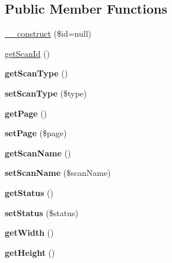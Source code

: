 \subsection*{Public Member Functions}
\begin{DoxyCompactItemize}
\item 
\hyperlink{classScan_ab363efba88dd615f165bc1466558b5ed}{\_\-\_\-construct} (\$id=null)
\item 
\hyperlink{classScan_a30ad0e456f9d0f3b3b0ef028e7e36d37}{getScanId} ()
\item 
\hypertarget{classScan_a42dd7daac88813b9d6f56fe25200b091}{
{\bfseries getScanType} ()}
\label{classScan_a42dd7daac88813b9d6f56fe25200b091}

\item 
\hypertarget{classScan_ad48c38cfecac0d7cc68987eaa94a4fd4}{
{\bfseries setScanType} (\$type)}
\label{classScan_ad48c38cfecac0d7cc68987eaa94a4fd4}

\item 
\hypertarget{classScan_a87a54b3f76ea8d9ebd38fca9e1cb872a}{
{\bfseries getPage} ()}
\label{classScan_a87a54b3f76ea8d9ebd38fca9e1cb872a}

\item 
\hypertarget{classScan_a478d366c5f8260ff0137d6800f548174}{
{\bfseries setPage} (\$page)}
\label{classScan_a478d366c5f8260ff0137d6800f548174}

\item 
\hypertarget{classScan_a741711f2da30f700b912d332dd877805}{
{\bfseries getScanName} ()}
\label{classScan_a741711f2da30f700b912d332dd877805}

\item 
\hypertarget{classScan_a0851d58f59a4eb565e79433fa2bffbc5}{
{\bfseries setScanName} (\$scanName)}
\label{classScan_a0851d58f59a4eb565e79433fa2bffbc5}

\item 
\hypertarget{classScan_a8e73646b63b62868d2fdb5d7a786b37e}{
{\bfseries getStatus} ()}
\label{classScan_a8e73646b63b62868d2fdb5d7a786b37e}

\item 
\hypertarget{classScan_a3464fedd4ccf9fb835675d7f2728ca11}{
{\bfseries setStatus} (\$status)}
\label{classScan_a3464fedd4ccf9fb835675d7f2728ca11}

\item 
\hypertarget{classScan_a6da16877d1b4ce7c719df2ac4d60f087}{
{\bfseries getWidth} ()}
\label{classScan_a6da16877d1b4ce7c719df2ac4d60f087}

\item 
\hypertarget{classScan_a4e2e1dc0235c3a60c95afd4cf1335aa9}{
{\bfseries getHeight} ()}
\label{classScan_a4e2e1dc0235c3a60c95afd4cf1335aa9}


\end{DoxyCompactItemize}
